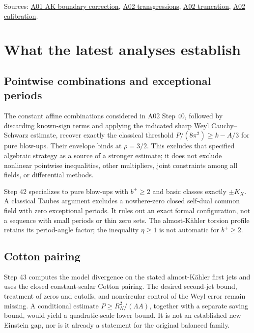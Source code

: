 \documentclass[
]{article}
\begin{document}
Sources:
\href{sources/Sessions/S1003A01/workspace/notes/step29_boundary_corrected_AK_exterior_and_contact_capacity.md}{A01
AK boundary correction},
\href{sources/Sessions/S1003A02/workspace/notes/step27_chiral_transgression_and_small_bolt.md}{A02
transgressions},
\href{sources/Sessions/S1003A02/workspace/notes/step26_truncation_flux_and_branch_completeness.md}{A02
truncation},
\href{sources/Sessions/S1003A02/workspace/notes/step35_calibration_theorem_and_branch_classification.md}{A02
calibration}.

\hypertarget{what-the-latest-analyses-establish}{%
\section{What the latest analyses
establish}\label{what-the-latest-analyses-establish}}

\hypertarget{pointwise-combinations-and-exceptional-periods}{%
\subsection{Pointwise combinations and exceptional
periods}\label{pointwise-combinations-and-exceptional-periods}}

The constant affine combinations considered in A02 Step 40, followed by
discarding known-sign terms and applying the indicated sharp Weyl
Cauchy--Schwarz estimate, recover exactly the classical threshold
\(P/(8\pi^2)\ge k-A/3\) for pure blow-ups. Their envelope binds at
\(\rho=3/2\). This excludes that specified algebraic strategy as a
source of a stronger estimate; it does not exclude nonlinear pointwise
inequalities, other multipliers, joint constraints among all fields, or
differential methods.

Step 42 specializes to pure blow-ups with \(b^+\ge2\) and basic classes
exactly \(\pm K_X\). A classical Taubes argument excludes a nowhere-zero
closed self-dual common field with zero exceptional periods. It rules
out an exact formal configuration, not a sequence with small periods or
thin zero sets. The almost-Kähler torsion profile retains its
period-angle factor; the inequality \(\eta\ge1\) is not automatic for
\(b^+\ge2\).

\hypertarget{cotton-pairing}{%
\subsection{Cotton pairing}\label{cotton-pairing}}

Step 43 computes the model divergence on the stated almost-Kähler first
jets and uses the closed constant-scalar Cotton pairing. The desired
second-jet bound, treatment of zeros and cutoffs, and noncircular
control of the Weyl error remain missing. A conditional estimate
\(P\ge R_N^2/(\Lambda A)\), together with a separate saving bound, would
yield a quadratic-scale lower bound. It is not an established new
Einstein gap, nor is it already a statement for the original balanced
family.
\end{document}
